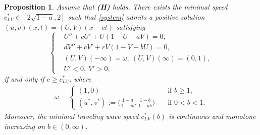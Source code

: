 \documentclass[11pt,a4paper]{article}
\newtheorem{proposition}[theorem]{\textbf{Proposition}}
\numberwithin{equation}{section}
\numberwithin{figure}{section}
\newcommand\dps{\displaystyle}
\newcommand\beaa{\begin{eqnarray*}}
\newcommand\eeaa{\end{eqnarray*}}
\begin{document}
\begin{proposition}\label{prop:existence-appendix}
Assume that {\bf(H)} holds. There exists the minimal speed $c_{LV}^{*}\in[2\sqrt{1-a},2]$
such that \eqref{system} admits a positive solution
$(u,v)(x,t)=(U,V)(x-ct)$ satisfying
\begin{equation}\label{TW-appendix}
\left\{
\begin{aligned}
&U''+cU'+U(1-U-aV)=0,\\
&dV''+cV'+rV(1-V-bU)=0,\\
&(U,V)(-\infty)=\omega,\ (U,V)(\infty)=(0,1),\\
&U'<0,\ V'>0,
\end{aligned}
\right.
\end{equation}
if and only if $c\ge c_{LV}^{*}$, where
\beaa
\omega=\begin{cases}
(1,0)&\quad \mbox{if $b\geq 1$},\\
\dps (u^*,v^*):=\Big(\frac{1-a}{1-ab},\frac{1-b}{1-ab}\Big)&\quad \mbox{if $0<b<1$}.
\end{cases}
\eeaa
Moreover, the minimal traveling wave speed $c_{LV}^{*}(b)$ is continuous and monotone increasing on $b\in(0,\infty)$.
\end{proposition}
\end{document}
